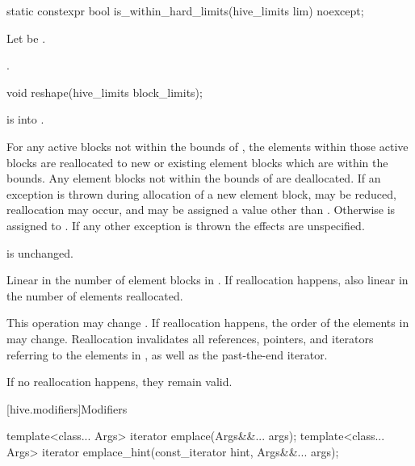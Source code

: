 %
\begin{itemdecl}
static constexpr bool is_within_hard_limits(hive_limits lim) noexcept;
\end{itemdecl}

\begin{itemdescr}
\pnum
Let  be .

\pnum
\returns
{}.
\end{itemdescr}

%
\begin{itemdecl}
void reshape(hive_limits block_limits);
\end{itemdecl}

\begin{itemdescr}
\pnum
\expects
{} is  into .

\pnum
\effects
For any active blocks not within the bounds of ,
the elements within those active blocks are reallocated
to new or existing element blocks which are within the bounds.
Any element blocks not within the bounds of 
are deallocated.
If an exception is thrown during allocation of a new element block,
 may be reduced,
reallocation may occur, and
 may be assigned
a value other than .
Otherwise  is assigned to .
If any other exception is thrown the effects are unspecified.

\pnum
\ensures
{} is unchanged.

\pnum
\complexity
Linear in the number of element blocks in .
If reallocation happens, also linear in the number of elements reallocated.

\pnum
\remarks
This operation may change .
If reallocation happens, the order of the elements in  may change.
Reallocation invalidates all references, pointers, and iterators
referring to the elements in ,
as well as the past-the-end iterator.
\begin{note}
If no reallocation happens, they remain valid.
\end{note}
\end{itemdescr}

[hive.modifiers]{Modifiers}

%
\begin{itemdecl}
template<class... Args> iterator emplace(Args&&... args);
template<class... Args> iterator emplace_hint(const_iterator hint, Args&&... args);
\end{itemdecl}

